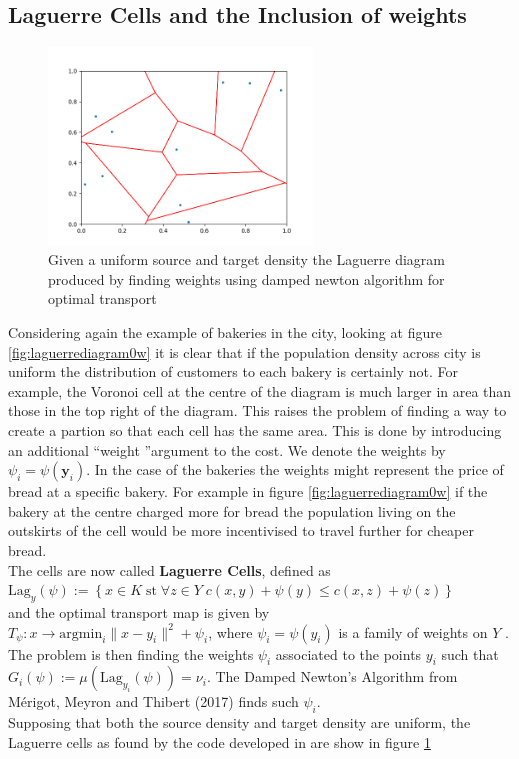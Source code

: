 \subsection{Laguerre Cells and the Inclusion of weights}
 \begin{figure}[h]
	\centering
	\includegraphics[width=7cm]{project/laguerre_diagram_OTw}
	\caption[Laguerre diagram produced by finding weights using damped newton algorithm for optimal transport]{Given a uniform source and target density the Laguerre diagram produced by finding weights using damped newton algorithm for optimal transport}
	\label{fig:laguerrediagramotw}
\end{figure}
Considering again the example of bakeries in the city, looking at figure \ref{fig:laguerrediagram0w} it is clear that if the population density across city is uniform the distribution of customers to each bakery is certainly not. For example, the Voronoi cell at the centre of the diagram is much larger in area than those in the top right of the diagram. This raises the problem of finding a way to create a partion so that each cell has the same area. This is done by introducing an additional \textquotedblleft weight \textquotedblright  argument to the cost. We denote the weights by $\psi_i = \psi\left(\bm{y}_i\right)$. In the case of the bakeries the weights might represent the price of bread at a specific bakery. For example in figure \ref{fig:laguerrediagram0w} if the bakery at the centre charged more for bread the population living on the outskirts of the cell would be more incentivised to travel further for cheaper bread.\\
\linebreak
The cells are now called  \textbf{Laguerre Cells}, defined as \\ $\text{Lag}_y(\psi) := \left\lbrace x \in K \; \text{st} \; \forall z \in Y \; c(x,y) + \psi(y) \leq c(x,z) + \psi(z) \right\rbrace$ \\ and the optimal transport map is given by \\
$T_\psi: x \rightarrow \text{argmin}_i\| x - y_i \|^2 + \psi_i$, where $\psi_i = \psi(y_i)$ is a family of weights on $Y$ \cite{Merigot2017}.\\
\linebreak
 The problem is then finding the weights $\psi_i$ associated to the points $y_i$ such that $G_i(\psi) := \mu (\text{Lag}_{y_i}(\psi)) = \nu_i$. The Damped Newton's Algorithm from M\'{e}rigot, Meyron and Thibert (2017) \cite{Merigot2017} finds such $\psi_i$.
 \\
 \linebreak 
 Supposing that both the source density and target density are uniform, the Laguerre cells as found by the code developed in \cite{Merigot2017} are show in figure \ref{fig:laguerrediagramotw}
